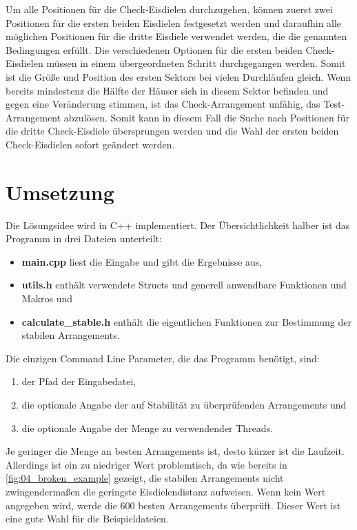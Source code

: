 \documentclass[a4paper,10pt,ngerman,captions=figureheading]{scrartcl}
\begin{document}
\medskip
Um alle Positionen für die Check-Eisdielen durchzugehen, können zuerst zwei Positionen für die ersten beiden Eisdielen festgesetzt werden und daraufhin alle möglichen Positionen für die dritte Eisdiele verwendet werden, die die genannten Bedingungen erfüllt.
Die verschiedenen Optionen für die ersten beiden Check-Eisdielen müssen in einem übergeordneten Schritt durchgegangen werden.
Somit ist die Größe und Position des ersten Sektors bei vielen Durchläufen gleich.
Wenn bereits mindestenz die Hälfte der Häuser sich in diesem Sektor befinden und gegen eine Veränderung stimmen, ist das Check-Arrangement unfähig, das Test-Arrangement abzulösen.
Somit kann in diesem Fall die Suche nach Positionen für die dritte Check-Eisdiele übersprungen werden und die Wahl der ersten beiden Check-Eisdielen sofort geändert werden.

\section{Umsetzung}
Die Lösungsidee wird in C++ implementiert.
Der Übersichtlichkeit halber ist das Programm in drei Dateien unterteilt:
\begin{itemize}
    \item \textbf{main.cpp} liest die Eingabe und gibt die Ergebnisse aus,
    \item \textbf{utils.h} enthält verwendete Structs und generell anwendbare Funktionen und Makros und
    \item \textbf{calculate\_stable.h} enthält die eigentlichen Funktionen zur Bestimmung der stabilen Arrangements.
\end{itemize}
Die einzigen Command Line Parameter, die das Programm benötigt, sind:
\begin{enumerate}
    \item der Pfad der Eingabedatei,
    \item die optionale Angabe der auf Stabilität zu überprüfenden Arrangements und
    \item die optionale Angabe der Menge zu verwendender Threads.
\end{enumerate}

Je geringer die Menge an besten Arrangements ist, desto kürzer ist die Laufzeit.
Allerdings ist ein zu niedriger Wert problemtisch, da wie bereits in \autoref{fig:04_broken_example} gezeigt, die stabilen Arrangements nicht zwingendermaßen die geringste Eisdielendistanz aufweisen.
Wenn kein Wert angegeben wird, werde die $600$ besten Arrangements überprüft.
Dieser Wert ist eine gute Wahl für die Beispieldateien.
\end{document}
